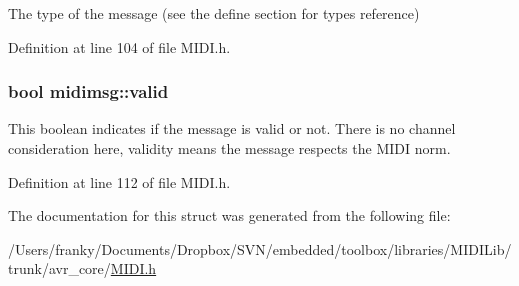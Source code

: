 The type of the message (see the define section for types reference) 

Definition at line 104 of file MIDI.h.\hypertarget{structmidimsg_dd91395b86cb7ace5ba8c1654ab61d2e}{
\subsubsection[{valid}]{\setlength{\rightskip}{0pt plus 5cm}bool {\bf midimsg::valid}}}
\label{structmidimsg_dd91395b86cb7ace5ba8c1654ab61d2e}


This boolean indicates if the message is valid or not. There is no channel consideration here, validity means the message respects the MIDI norm. 

Definition at line 112 of file MIDI.h.

The documentation for this struct was generated from the following file:\begin{CompactItemize}
\item 
/Users/franky/Documents/Dropbox/SVN/embedded/toolbox/libraries/MIDILib/trunk/avr\_\-core/\hyperlink{_m_i_d_i_8h}{MIDI.h}\end{CompactItemize}

